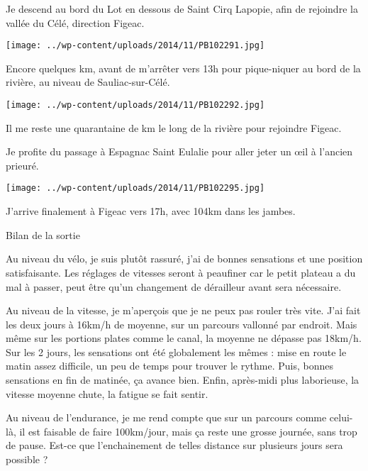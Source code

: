  Je descend au bord du Lot en dessous de Saint Cirq Lapopie, afin de rejoindre la vallée du Célé, direction Figeac.

 

\begin{center} \texttt{[image: ../wp-content/uploads/2014/11/PB102291.jpg]} \end{center}



 Encore quelques km, avant de m'arrêter vers 13h pour pique-niquer au bord de la rivière, au niveau de Sauliac-sur-Célé.

 

\begin{center} \texttt{[image: ../wp-content/uploads/2014/11/PB102292.jpg]} \end{center}



 Il me reste une quarantaine de km le long de la rivière pour rejoindre Figeac.

 Je profite du passage à Espagnac Saint Eulalie pour aller jeter un œil à l'ancien prieuré.

 

\begin{center} \texttt{[image: ../wp-content/uploads/2014/11/PB102295.jpg]} \end{center}



 J'arrive finalement à Figeac vers 17h, avec 104km dans les jambes.

 Bilan de la sortie

 Au niveau du vélo, je suis plutôt rassuré, j'ai de bonnes sensations et une position satisfaisante. Les réglages de vitesses seront à peaufiner car le petit plateau a du mal à passer, peut être qu'un changement de dérailleur avant sera nécessaire.

 Au niveau de la vitesse, je m'aperçois que je ne peux pas rouler très vite. J'ai fait les deux jours à 16km/h de moyenne, sur un parcours vallonné par endroit. Mais même sur les portions plates comme le canal, la moyenne ne dépasse pas 18km/h. Sur les 2 jours, les sensations ont été globalement les mêmes : mise en route le matin assez difficile, un peu de temps pour trouver le rythme. Puis, bonnes sensations en fin de matinée, ça avance bien. Enfin, après-midi plus laborieuse, la vitesse moyenne chute, la fatigue se fait sentir.

 Au niveau de l'endurance, je me rend compte que sur un parcours comme celui-là, il est faisable de faire 100km/jour, mais ça reste une grosse journée, sans trop de pause. Est-ce que l'enchainement de telles distance sur plusieurs jours sera possible ?

